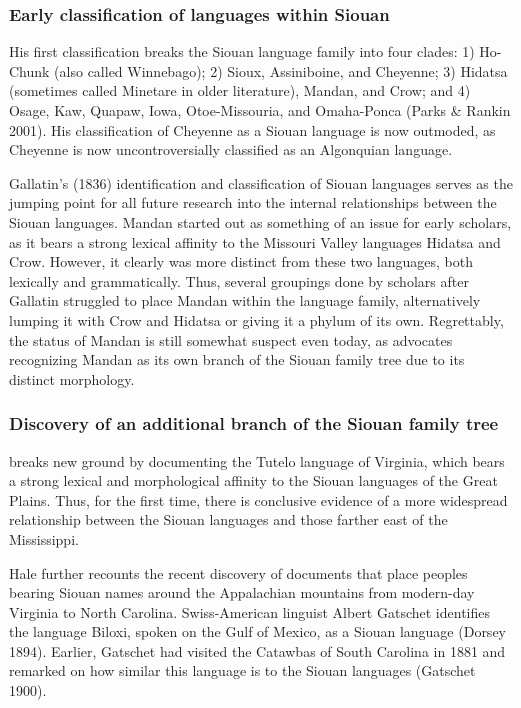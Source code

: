 \documentclass[output=paper]{LSP/langsci}
\begin{document}
\subsubsection{Early classification of languages within Siouan}

His first classification breaks the Siouan language family into four clades: 1) Ho-Chunk (also called Winnebago); 2) Sioux, Assiniboine, and Cheyenne; 3) Hidatsa (sometimes called Minetare in older literature), Mandan, and Crow; and 4) Osage, Kaw, Quapaw, Iowa, Otoe-Missouria, and Omaha-Ponca (Parks \& Rankin 2001). His classification of Cheyenne as a Siouan language is now outmoded, as Cheyenne is now uncontroversially classified as an Algonquian language.

Gallatin's (1836) identification and classification of Siouan languages serves as the jumping point for all future research into the internal relationships between the Siouan languages. Mandan started out as something of an issue for early scholars, as it bears a strong lexical affinity to the Missouri Valley languages Hidatsa and Crow. However, it clearly was more distinct from these two languages, both lexically and grammatically. Thus, several groupings done by scholars after Gallatin struggled to place Mandan within the language family, alternatively lumping it with Crow and Hidatsa or giving it a phylum of its own. Regrettably, the status of Mandan is still somewhat suspect even today, as \citet{Rankin2010} advocates recognizing Mandan as its own branch of the Siouan family tree due to its distinct morphology.

\subsubsection{Discovery of an additional branch of the Siouan family tree} \citet{Hale1883} breaks new ground by documenting the Tutelo language of Virginia, which bears a strong lexical and morphological affinity to the Siouan languages of the Great Plains. Thus, for the first time, there is conclusive evidence of a more widespread relationship between the Siouan languages and those farther east of the Mississippi. 

Hale further recounts the recent discovery of documents that place peoples bearing Siouan names around the Appalachian mountains from modern-day Virginia to North Carolina. Swiss-American linguist Albert Gatschet identifies the language Biloxi, spoken on the Gulf of Mexico, as a Siouan language (Dorsey 1894). Earlier, Gatschet had visited the Catawbas of South Carolina in 1881 and remarked on how similar this language is to the Siouan languages (Gatschet 1900). 
\end{document}
